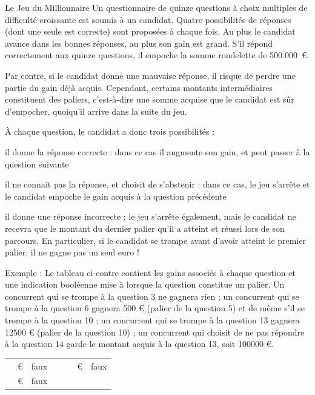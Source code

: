 \begin{Exercice}{Le Jeu du Millionnaire}
	Un questionnaire de quinze questions à choix
	multiples de difficulté croissante est soumis à un candidat. Quatre
	possibilités de réponses (dont une seule est correcte) sont proposées à
	chaque fois. Au plus le candidat avance dans les bonnes réponses, au
	plus son gain est grand. S’il répond correctement aux quinze questions,
	il empoche la somme rondelette de 500.000~€.
	
	Par contre, si le candidat donne une mauvaise
	réponse, il risque de perdre une partie du gain déjà acquis. Cependant,
	certains montants intermédiaires constituent des paliers, c’est-à-dire
	une somme acquise que le candidat est sûr d’empocher, quoiqu’il arrive
	dans la suite du jeu.

À chaque question, le candidat a donc trois
	possibilités :

	\begin{liste}
		\item 
			il donne la réponse correcte : dans ce cas il
			augmente son gain, et peut passer à la question suivante
		\item 
			il ne connait pas la réponse, et choisit de
			s’abstenir : dans ce cas, le jeu s’arrête et le candidat empoche le
			gain acquis à la question précédente
		\item 
			il donne une réponse incorrecte : le jeu
			s’arrête également, mais le candidat ne recevra que le montant du
			dernier palier qu’il a atteint et réussi lors de son parcours. En
			particulier, si le candidat se trompe avant d’avoir atteint le premier
			palier, il ne gagne pas un seul euro !
	\end{liste}
	
	Exemple : Le tableau ci-contre contient les gains associés à chaque 
	question et une indication booléenne mise à
	 lorsque la question
	constitue un palier. Un concurrent qui se
	trompe à la question 3 ne gagnera rien ; un concurrent qui se trompe à
	la question 6 gagnera 500 € (palier de la question 5) et de même s’il
	se trompe à la question 10 ; un concurrent qui se trompe à la question
	13 gagnera 12500 € (palier de la question 10) ; un concurrent qui
	choisit de ne pas répondre à la question 14 garde le montant acquis à
	la question 13, soit 100000 €.

	\begin{center}
	\begin{minipage}{7.041cm}
	\begin{flushleft}
	\tablehead{}
	\begin{supertabular}{|m{0.27600002cm}|m{1.1509999cm}|m{0.774cm}|m{0.12300001cm}|m{0.472cm}|m{1.6359999cm}|m{0.774cm}|}
	\hhline{---~---}
	 &
	 € &
	 faux &
	~
	 &
	 &
	 € &
	 faux\\\hhline{---~---}
	 &
	 € &
	 faux &
	~
	 &
	 &
	\raggedleft  {} &


\end{supertabular}
\end{flushleft}
\end{minipage}
\end{center}
\end{Exercice}
